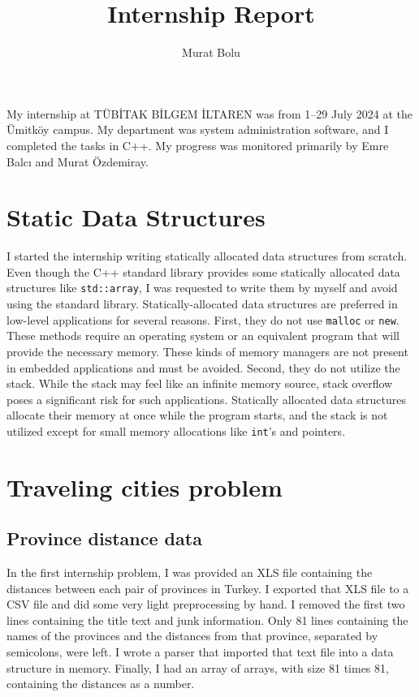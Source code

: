 \documentclass[12pt,a4paper]{article}
\title{Internship Report}
\author{Murat Bolu}
\begin{document}
\maketitle

My internship at TÜBİTAK BİLGEM İLTAREN was from 1--29 July 2024 at the Ümitköy
campus. My department was system administration software, and I completed the
tasks in C++. My progress was monitored primarily by Emre Balcı and Murat
Özdemiray.

\section{Static Data Structures}

I started the internship writing statically allocated data structures from
scratch. Even though the C++ standard library provides some statically allocated
data structures like \texttt{std::array}, I was requested to write them by
myself and avoid using the standard library. Statically-allocated data
structures are preferred in low-level applications for several reasons. First,
they do not use \texttt{malloc} or \texttt{new}. These methods require an
operating system or an equivalent program that will provide the necessary
memory. These kinds of memory managers are not present in embedded applications
and must be avoided. Second, they do not utilize the stack. While the stack may
feel like an infinite memory source, stack overflow poses a significant risk for
such applications. Statically allocated data structures allocate their memory at
once while the program starts, and the stack is not utilized except for small
memory allocations like \texttt{int}'s and pointers.

\section{Traveling cities problem}

\subsection{Province distance data}

In the first internship problem, I was provided an XLS file containing the
distances between each pair of provinces in Turkey. I exported that XLS file to
a CSV file and did some very light preprocessing by hand. I removed the first
two lines containing the title text and junk information. Only 81 lines
containing the names of the provinces and the distances from that province,
separated by semicolons, were left. I wrote a parser that imported that text
file into a data structure in memory. Finally, I had an array of arrays, with
size 81 times 81, containing the distances as a number.
\end{document}
